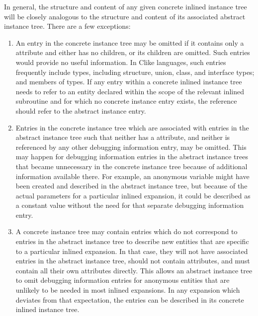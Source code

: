 In general, the structure and content of any given concrete
inlined instance tree will be closely analogous to the
structure and content of its associated abstract instance
tree. There are a few exceptions:

\begin{enumerate}[1.]
\item An entry in the concrete instance tree may be omitted if
it contains only a 
 attribute and either
has no children, or its children are omitted. Such entries
would provide no useful information. In C\dash like languages,
such entries frequently include types, including structure,
union, class, and interface types; and members of types. If any
entry within a concrete inlined instance tree needs to refer
to an entity declared within the scope of the relevant inlined
subroutine and for which no concrete instance entry exists,
the reference should refer to the abstract instance entry.

\item Entries in the concrete instance tree which are associated
with entries in the abstract instance tree such that neither
has a  attribute, and neither is referenced by
any other debugging information entry, may be omitted. This
may happen for debugging information entries in the abstract
instance trees that became unnecessary in the concrete instance
tree because of additional information available there. For
example, an anonymous variable might have been created and
described in the abstract instance tree, but because of
the actual parameters for a particular inlined expansion,
it could be described as a constant value without the need
for that separate debugging information entry.

\item A concrete instance tree may contain entries which do
not correspond to entries in the abstract instance tree
to describe new entities that are specific to a particular
inlined expansion. In that case, they will not have associated
entries in the abstract instance tree, should not contain
 attributes, and must contain all their
own attributes directly. This allows an abstract instance tree
to omit debugging information entries for anonymous entities
that are unlikely to be needed in most inlined expansions. In
any expansion which deviates from that expectation, the
entries can be described in its concrete inlined instance tree.

\end{enumerate}

